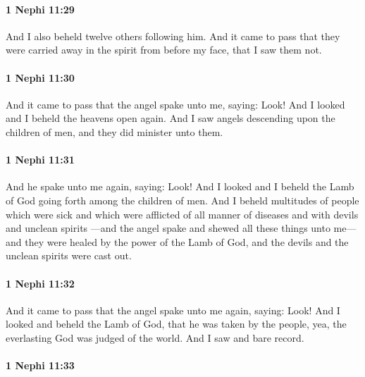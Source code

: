 		\paragraph{1 Nephi 11:29} %
			\label{1NEPHI-11-29}

			And I also beheld twelve others following him.
			And it came to pass that they were carried away in the spirit from before my face,
			that I saw them not.

		\paragraph{1 Nephi 11:30} %
			\label{1NEPHI-11-30}

			And it came to pass that the angel spake unto me, saying: Look!
			And I looked and I beheld the heavens open again.
			And I saw angels descending upon the children of men,
			and they did minister unto them.

		\paragraph{1 Nephi 11:31} %
			\label{1NEPHI-11-31}

			And he spake unto me again, saying: Look!
			And I looked and I beheld the Lamb of God
			going forth among the children of men.
			And I beheld multitudes of people which were sick
			and which were afflicted of all manner of diseases
			and with devils and unclean spirits
			---and the angel spake and shewed all these things unto me---
			and they were healed by the power of the Lamb of God,
			and the devils and the unclean spirits were cast out.

		\paragraph{1 Nephi 11:32} %
			\label{1NEPHI-11-32}

			And it came to pass that the angel spake unto me again, saying: Look!
			And I looked and beheld the Lamb of God,
			that he was taken by the people,
			yea, the everlasting God was judged of the world.
			And I saw and bare record.

		\paragraph{1 Nephi 11:33} %
			\label{1NEPHI-11-33}

